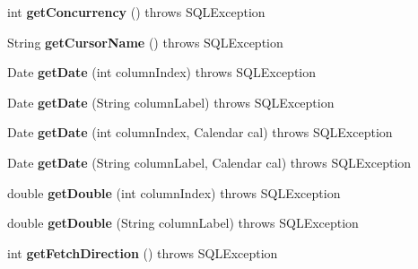 \begin{DoxyCompactItemize}
int {\bfseries get\+Concurrency} ()  throws S\+Q\+L\+Exception 
\item 
\mbox{\label{classsimpledb_1_1jdbc_1_1ResultSetAdapter_aa1160fc11ac5db6865b50c1c844e5a61}} 
String {\bfseries get\+Cursor\+Name} ()  throws S\+Q\+L\+Exception 
\item 
\mbox{\label{classsimpledb_1_1jdbc_1_1ResultSetAdapter_a87672483d62bc6afc09eb0d3079f572b}} 
Date {\bfseries get\+Date} (int column\+Index)  throws S\+Q\+L\+Exception 
\item 
\mbox{\label{classsimpledb_1_1jdbc_1_1ResultSetAdapter_a6f1edc56b817e2e0d884df9a0cbca2d3}} 
Date {\bfseries get\+Date} (String column\+Label)  throws S\+Q\+L\+Exception 
\item 
\mbox{\label{classsimpledb_1_1jdbc_1_1ResultSetAdapter_a31fbd57a567a0e759e08e74030abb039}} 
Date {\bfseries get\+Date} (int column\+Index, Calendar cal)  throws S\+Q\+L\+Exception 
\item 
\mbox{\label{classsimpledb_1_1jdbc_1_1ResultSetAdapter_a901bf084765d37f253446f4f7cff5068}} 
Date {\bfseries get\+Date} (String column\+Label, Calendar cal)  throws S\+Q\+L\+Exception 
\item 
\mbox{\label{classsimpledb_1_1jdbc_1_1ResultSetAdapter_a1df2087f7f5de95f6b5d7474277583a4}} 
double {\bfseries get\+Double} (int column\+Index)  throws S\+Q\+L\+Exception 
\item 
\mbox{\label{classsimpledb_1_1jdbc_1_1ResultSetAdapter_a21852ce20b660d1aaa7e73c9b382e0da}} 
double {\bfseries get\+Double} (String column\+Label)  throws S\+Q\+L\+Exception 
\item 
\mbox{\label{classsimpledb_1_1jdbc_1_1ResultSetAdapter_adc42f5e5eba4a10c8865d61fdeda548f}} 
int {\bfseries get\+Fetch\+Direction} ()  throws S\+Q\+L\+Exception 
\item 
\mbox{\label{classsimpledb_1_1jdbc_1_1ResultSetAdapter_a9bf41c1771605d1a6a56c581d47a332d}} 

\end{DoxyCompactItemize}
